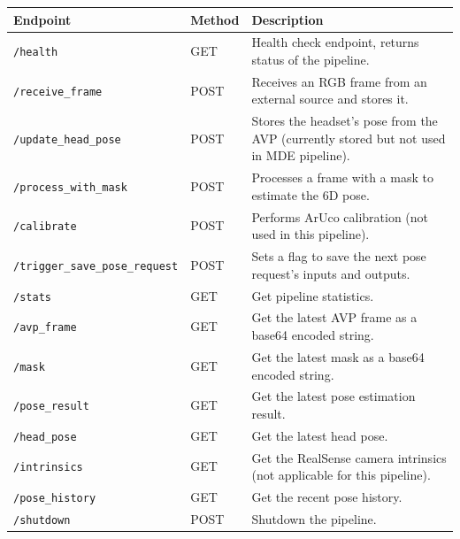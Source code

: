 \documentclass{article}
\begin{document}
\begin{longtable}{| >{\raggedright\arraybackslash}p{} | >{\raggedright\arraybackslash}p{} | >{\raggedright\arraybackslash}p{} |}
\hline
\textbf{Endpoint} & \textbf{Method} & \textbf{Description} \\
\hline
\endhead

\texttt{/health} & GET & Health check endpoint, returns status of the pipeline. \\
\hline
\texttt{/receive\_frame} & POST & Receives an RGB frame from an external source and stores it. \\
\hline
\texttt{/update\_head\_pose} & POST & Stores the headset's pose from the AVP (currently stored but not used in MDE pipeline). \\
\hline
\texttt{/process\_with\_mask} & POST & Processes a frame with a mask to estimate the 6D pose. \\
\hline
\texttt{/calibrate} & POST & Performs ArUco calibration (not used in this pipeline). \\
\hline
\texttt{/trigger\_save\_pose\_request} & POST & Sets a flag to save the next pose request's inputs and outputs. \\
\hline
\texttt{/stats} & GET & Get pipeline statistics. \\
\hline
\texttt{/avp\_frame} & GET & Get the latest AVP frame as a base64 encoded string. \\
\hline
\texttt{/mask} & GET & Get the latest mask as a base64 encoded string. \\
\hline
\texttt{/pose\_result} & GET & Get the latest pose estimation result. \\
\hline
\texttt{/head\_pose} & GET & Get the latest head pose. \\
\hline
\texttt{/intrinsics} & GET & Get the RealSense camera intrinsics (not applicable for this pipeline). \\
\hline
\texttt{/pose\_history} & GET & Get the recent pose history. \\
\hline
\texttt{/shutdown} & POST & Shutdown the pipeline. \\
\hline
\end{longtable}
\end{document}
